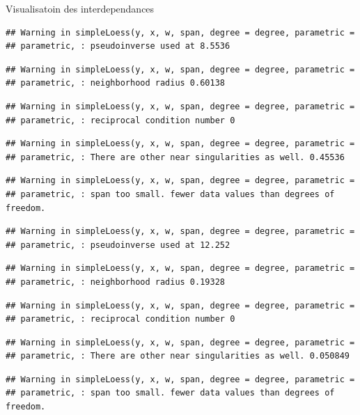 \documentclass[11pt,ignorenonframetext,]{beamer}
\begin{document}
\begin{frame}[fragile]{Visualisatoin des interdependances}
\begin{verbatim}
## Warning in simpleLoess(y, x, w, span, degree = degree, parametric =
## parametric, : pseudoinverse used at 8.5536
\end{verbatim}

\begin{verbatim}
## Warning in simpleLoess(y, x, w, span, degree = degree, parametric =
## parametric, : neighborhood radius 0.60138
\end{verbatim}

\begin{verbatim}
## Warning in simpleLoess(y, x, w, span, degree = degree, parametric =
## parametric, : reciprocal condition number 0
\end{verbatim}

\begin{verbatim}
## Warning in simpleLoess(y, x, w, span, degree = degree, parametric =
## parametric, : There are other near singularities as well. 0.45536
\end{verbatim}

\begin{verbatim}
## Warning in simpleLoess(y, x, w, span, degree = degree, parametric =
## parametric, : span too small. fewer data values than degrees of freedom.
\end{verbatim}

\begin{verbatim}
## Warning in simpleLoess(y, x, w, span, degree = degree, parametric =
## parametric, : pseudoinverse used at 12.252
\end{verbatim}

\begin{verbatim}
## Warning in simpleLoess(y, x, w, span, degree = degree, parametric =
## parametric, : neighborhood radius 0.19328
\end{verbatim}

\begin{verbatim}
## Warning in simpleLoess(y, x, w, span, degree = degree, parametric =
## parametric, : reciprocal condition number 0
\end{verbatim}

\begin{verbatim}
## Warning in simpleLoess(y, x, w, span, degree = degree, parametric =
## parametric, : There are other near singularities as well. 0.050849
\end{verbatim}

\begin{verbatim}
## Warning in simpleLoess(y, x, w, span, degree = degree, parametric =
## parametric, : span too small. fewer data values than degrees of freedom.
\end{verbatim}


\end{frame}
\end{document}

